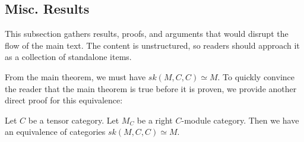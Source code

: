 
\subsection{Misc. Results}

\noindent This subsection gathers results, proofs, and arguments that would
disrupt the flow of the main text. The content is unstructured, so readers
should approach it as a collection of standalone items.

\noindent From the main theorem, we must have $sk(M,C,C) \simeq M$. To quickly
convince the reader that the main theorem is true before it is proven, we
provide another direct proof for this equivalence:

\begin{proposition} \label{proposition/degenerated-main-theorem}

  \noindent Let $C$ be a tensor category. Let $M_{C}$ be a right $C$-module
  category. \quad Then we have an equivalence of categories $sk(M,C,C) \simeq
  M$.
\end{proposition}

